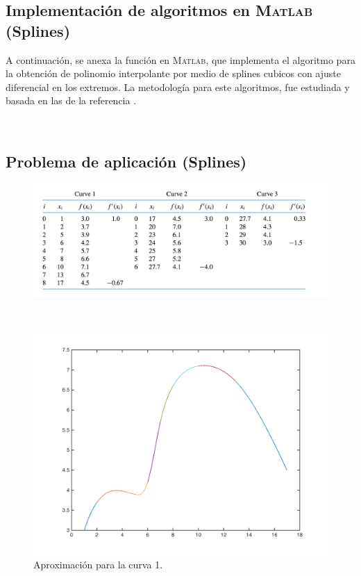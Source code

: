 \documentclass[11pt, spanish]{article}
\begin{document}
\subsection{Implementación de algoritmos en \textsc{Matlab} (Splines)}

A continuación, se anexa la función en \textsc{Matlab}, que implementa el algoritmo para la obtención de polinomio interpolante por medio de splines cubicos con ajuste diferencial en los extremos. La metodología para este algoritmos, fue estudiada y basada en las de la referencia \cite{burden2010numerical}.

\

\subsection{Problema de aplicación (Splines)}

\begin{figure}[H]
\centering
	\includegraphics[scale=0.4]{data/img/snoopytable}
	\caption{}
\end{figure}

\

\begin{figure}[!hbt]
\centering
	\includegraphics[scale=0.6]{data/img/curve1}
	\caption{Aproximación para la curva 1.}
\end{figure}
\end{document}

